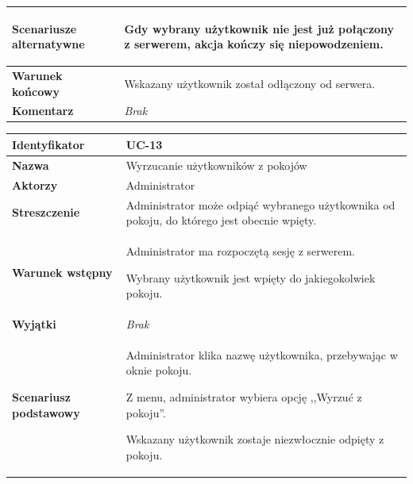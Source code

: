 {\begin{tabular}{ | l | l | }
	\hline
		\textbf{Scenariusze alternatywne} & \parbox[t]
		{11cm}{
			\begin{enumreq}
				\item Gdy wybrany użytkownik nie jest już połączony z serwerem, akcja
				kończy się niepowodzeniem.
			\end{enumreq}
		}
		\\

	\hline
		\textbf{Warunek końcowy} & \parbox[t]{11cm}{
			Wskazany użytkownik został odłączony od serwera.
		}
		\\

	\hline
		\textbf{Komentarz} & \parbox[t]{11cm}{
			\textit{Brak}
		}
		\\

	\hline
\end{tabular}

\vspace{2em}

\begin{tabular}{ | l | l | }
	\hline
		\textbf{Identyfikator} &
		UC-13
		\\

	\hline
		\textbf{Nazwa} &
		Wyrzucanie użytkowników z pokojów
		\\

	\hline
		\textbf{Aktorzy} & \parbox[t]{11cm}{
			Administrator
		}\\

	\hline
		\textbf{Streszczenie} & \parbox[t]{11cm}{
			Administrator może odpiąć wybranego użytkownika od pokoju, do którego jest
			obecnie wpięty.
		}\\

	\hline
		\textbf{Warunek wstępny} & \parbox[t]{11cm}{
			\begin{enumreq}
				\item Administrator ma rozpoczętą sesję z serwerem.
				\item Wybrany użytkownik jest wpięty do jakiegokolwiek pokoju.
			\end{enumreq}
		}
		\\

	\hline
		\textbf{Wyjątki} & \parbox[t]{11cm}{
			\textit{Brak}

		}
		\\

	\hline
		\textbf{Scenariusz podstawowy} & \parbox[t]{11cm}{
			\begin{enumreq}
				\item Administrator klika nazwę użytkownika, przebywając w oknie pokoju.
				\item Z menu, administrator wybiera opcję ,,Wyrzuć z pokoju''.
				\item Wskazany użytkownik zostaje niezwłocznie odpięty z pokoju.
			\end{enumreq}
		}
		\\


\end{tabular}}

